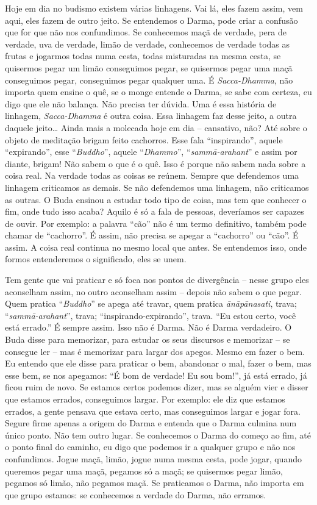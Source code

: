 Hoje em dia no budismo existem várias linhagens. Vai lá, eles fazem
assim, vem aqui, eles fazem de outro jeito. Se entendemos o Darma, pode
criar a confusão que for que não nos confundimos. Se conhecemos maçã de
verdade, pera de verdade, uva de verdade, limão de verdade, conhecemos
de verdade todas as frutas e jogarmos todas numa cesta, todas
misturadas na mesma cesta, se quisermos pegar um limão conseguimos
pegar, se quisermos pegar uma maçã conseguimos pegar, conseguimos pegar
qualquer uma. É \textit{Sacca-Dhamma}, não importa quem ensine o quê,
se o monge entende o Darma, se sabe com certeza, eu digo que ele não
balança. Não precisa ter dúvida. Uma é essa história de linhagem,
\textit{Sacca-Dhamma} é outra coisa. Essa linhagem faz desse jeito, a
outra daquele jeito… Ainda mais a molecada hoje em dia – cansativo,
não? Até sobre o objeto de meditação brigam feito cachorros. Esse fala
“inspirando”, aquele “expirando”, esse “\textit{Buddho}”, aquele
“\textit{Dhammo}”, “\textit{sammā-arahant}” e assim por diante,
brigam! Não sabem o que é o quê. Isso é porque não sabem nada sobre a
coisa real. Na verdade todas as coisas se reúnem. Sempre que defendemos
uma linhagem criticamos as demais. Se não defendemos uma linhagem, não
criticamos as outras. O Buda ensinou a estudar todo tipo de coisa, mas
tem que conhecer o fim, onde tudo isso acaba? Aquilo é só a fala de
pessoas, deveríamos ser capazes de ouvir. Por exemplo: a palavra “cão”
não é um termo definitivo, também pode chamar de “cachorro”. É assim,
não precisa se apegar a “cachorro” ou “cão”. É assim. A coisa real
continua no mesmo local que antes. Se entendemos isso, onde formos
entenderemos o significado, eles se unem. 

Tem gente que vai praticar e só foca nos pontos de divergência –
nesse grupo eles aconselham assim, no outro aconselham assim – depois
não sabem o que pegar. Quem pratica “\textit{Buddho}” se apega até
travar, quem pratica \textit{ānāpānasati}, trava;
“\textit{sammā-arahant}”, trava; “inspirando-expirando”, trava. “Eu
estou certo, você está errado.” É sempre assim. Isso não é Darma. Não é
Darma verdadeiro. O Buda disse para memorizar, para estudar os seus
discursos e memorizar – se consegue ler – mas é memorizar para largar
dos apegos. Mesmo em fazer o bem. Eu entendo que ele disse para
praticar o bem, abandonar o mal, fazer o bem, mas esse bem, se nos
apegamos: “É bom de verdade! Eu sou bom!”, já está errado, já ficou
ruim de novo. Se estamos certos podemos dizer, mas se alguém vier e
disser que estamos errados, conseguimos largar. Por exemplo: ele diz
que estamos errados, a gente pensava que estava certo, mas conseguimos
largar e jogar fora. Segure firme apenas a origem do Darma e entenda
que o Darma culmina num único ponto. Não tem outro lugar. Se conhecemos
o Darma do começo ao fim, até o ponto final do caminho, eu digo que
podemos ir a qualquer grupo e não nos confundimos. Jogue maçã, limão,
jogue numa mesma cesta, pode jogar, quando queremos pegar uma maçã,
pegamos só a maçã; se quisermos pegar limão, pegamos só limão, não
pegamos maçã. Se praticamos o Darma, não importa em que grupo estamos:
se conhecemos a verdade do Darma, não erramos. 

